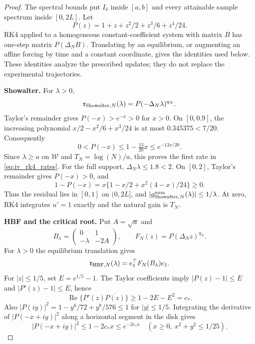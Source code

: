 \documentclass[11pt,a4paper,leqno]{article}
\numberwithin{equation}{section}
\numberwithin{figure}{section}
\numberwithin{table}{section}
\theoremstyle{plain}
\theoremstyle{definition}
\theoremstyle{remark}
\begin{document}
\begin{proof}
The spectral bounds put $I_\delta$ inside $[a,b]$ and every attainable
sample spectrum inside $[0,2L]$. Let
\[
 P(z)=1+z+z^2/2+z^3/6+z^4/24.
\]
RK4 applied to a homogeneous constant-coefficient system with matrix $B$
has one-step matrix $P(\Delta_N B)$. Translating by an equilibrium, or
augmenting an affine forcing by time and a constant coordinate, gives
the identities used below. These identities analyze the prescribed
updates; they do not replace the experimental trajectories.

\medskip\noindent\textbf{Showalter.}
For $\lambda>0$,
\[
 \mathfrak{r}_{{\rm Showalter},N}(\lambda)
   =P(-\Delta_N\lambda)^{q_N}.
\]
Taylor's remainder gives $P(-x)>e^{-x}>0$ for $x>0$. On $[0,0.9]$,
the increasing polynomial $x/2-x^2/6+x^3/24$ is at most
$0.345375<7/20$. Consequently
\[
 0<P(-x)\le1-\tfrac{13}{20}x
               \le e^{-13x/20}.
\]
Since $\lambda\ge a$ on $\mathcal W$ and $T_N=\log(N)/a$, this proves
the first rate in \eqref{eq:iv_rk4_rates}. For the full support,
$\Delta_N\lambda\le1.8<2$. On $[0,2]$, Taylor's remainder gives
$P(-x)>0$, and
\[
 1-P(-x)=x\{1-x/2+x^2(4-x)/24\}\ge0.
\]
Thus the residual lies in $[0,1]$ on $(0,2L]$, and
$|g_{{\rm Showalter},N}^{\rm num}(\lambda)|\le1/\lambda$.
At zero, RK4 integrates $u'=1$ exactly and the natural gain is $T_N$.

\medskip\noindent\textbf{HBF and the critical root.}
Put $A=\sqrt a$ and
\[
 B_\lambda=\begin{pmatrix}0&1\\-\lambda&-2A\end{pmatrix},\qquad
 F_N(z)=P(\Delta_N z)^{q_N}.
\]
For $\lambda>0$ the equilibrium translation gives
\begin{equation}\label{eq:iv_rk4_hbf_identity}
 \mathfrak{r}_{{\rm HBF},N}(\lambda)=e_1^\top F_N(B_\lambda)e_1.
\end{equation}
For $|z|\le1/5$, set $E=e^{1/5}-1$. The Taylor coefficients imply
$|P(z)-1|\le E$ and $|P'(z)-1|\le E$, hence
\[
 \operatorname{Re}\{P'(z)\overline{P(z)}\}
 \ge1-2E-E^2=c_*.
\]
Also $|P(iy)|^2=1-y^6/72+y^8/576\le1$ for $|y|\le1/5$.
Integrating the derivative of $|P(-x+iy)|^2$ along a horizontal segment
in the disk gives
\begin{equation}\label{eq:iv_rk4_left_disk}
 |P(-x+iy)|^2\le1-2c_*x\le e^{-2c_*x}
 \quad(x\ge0,\ x^2+y^2\le1/25).
\end{equation}


\end{proof}
\end{document}
